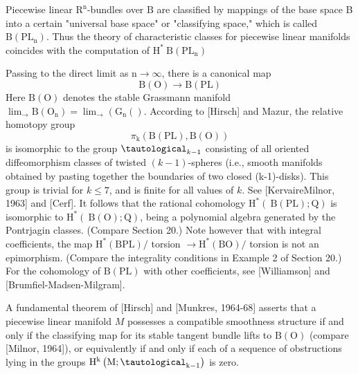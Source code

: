 \documentclass[10pt]{article}
\begin{document}
Piecewise linear $\mathrm{R}^{\mathrm{n}}$-bundles over $\mathrm{B}$ are classified by mappings of the base space B into a certain "universal base space" or "classifying space," which is called $\mathrm{B}\left(\mathrm{PL}_{\mathrm{n}}\right)$. Thus the theory of characteristic classes for piecewise linear manifolds coincides with the computation of $\mathrm{H}^{*} \mathrm{~B}\left(\mathrm{PL}_{\mathrm{n}}\right)$

Passing to the direct limit as $\mathrm{n} \rightarrow \infty$, there is a canonical map
$$
\mathrm{B}(\mathrm{O}) \rightarrow \mathrm{B}(\mathrm{PL})
$$
Here $\mathrm{B}(\mathrm{O})$ denotes the stable Grassmann manifold $\lim _{\rightarrow} \mathrm{B}\left(\mathrm{O}_{\mathrm{n}}\right)=\lim _{\rightarrow}\left(\mathrm{G}_{\mathrm{n}}()\right.$. According to [Hirsch] and Mazur, the relative homotopy group
$$
\pi_{\mathrm{k}}(\mathrm{B}(\mathrm{PL}), \mathrm{B}(\mathrm{O}))
$$
is isomorphic to the group $\tautological_{k-1}$ consisting of all oriented diffeomorphism classes of twisted $(k-1)$-spheres (i.e., smooth manifolds obtained by pasting together the boundaries of two closed (k-1)-disks). This group is trivial for $k \leq 7$, and is finite for all values of $k$. See [KervaireMilnor, 1963] and [Cerf]. It follows that the rational cohomology $\mathrm{H}^{*}(\mathrm{~B}(\mathrm{PL}) ; \mathrm{Q})$ is isomorphic to $\mathrm{H}^{*}(\mathrm{~B}(\mathrm{O}) ; \mathrm{Q})$, being a polynomial algebra generated by the Pontrjagin classes. (Compare Section 20.) Note however that with integral coefficients, the map $\mathrm{H}^{*}(\mathrm{BPL}) /$ torsion $\rightarrow \mathrm{H}^{*}(\mathrm{BO}) /$ torsion is not an epimorphism. (Compare the integrality conditions in Example 2 of Section 20.) For the cohomology of $\mathrm{B}(\mathrm{PL})$ with other coefficients, see [Williamson] and [Brumfiel-Madsen-Milgram].

A fundamental theorem of [Hirsch] and [Munkres, 1964-68] asserts that a piecewise linear manifold $M$ possesses a compatible smoothness structure if and only if the classifying map for its stable tangent bundle lifts to $\mathrm{B}(\mathrm{O})$ (compare [Milnor, 1964]), or equivalently if and only if each of a sequence of obstructions lying in the groups $\mathrm{H}^{\mathrm{k}}\left(\mathrm{M} ; \tautological_{\mathrm{k}-1}\right)$ is zero.
\end{document}
